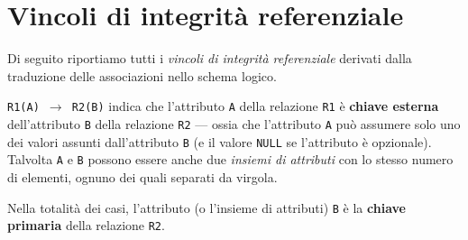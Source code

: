\section{Vincoli di integrità referenziale}\label{sec:foreignkeys}
Di seguito riportiamo tutti i {\it vincoli di integrità referenziale} derivati dalla traduzione
delle associazioni nello schema logico.

{\tt R1(A) $\rightarrow$ R2(B)} indica che l'attributo {\tt A} della relazione {\tt R1}
è {\bf chiave esterna} dell'attributo {\tt B} della relazione {\tt R2} --- ossia che l'attributo
{\tt A} può assumere solo uno dei valori assunti dall'attributo {\tt B} (e il valore
{\tt NULL} se l'attributo è opzionale). Talvolta {\tt A} e {\tt B} possono essere
anche due {\it insiemi di attributi} con lo stesso numero di elementi, ognuno dei quali
separati da virgola.

Nella totalità dei casi, l'attributo (o l'insieme di attributi) {\tt B} è la
{\bf chiave primaria} della relazione {\tt R2}.


